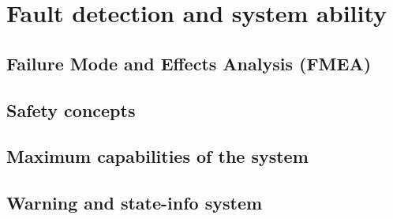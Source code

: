 \documentclass[ExampleMasters.tex]{subfiles}
\begin{document}
\clearpage


\chapter{Fault detection and system ability}
\label{chap:fault_detection}
\section{Failure Mode and Effects Analysis (FMEA)}
\section{Safety concepts}

\section{Maximum capabilities of the system}

\section{Warning and state-info system}
\end{document}
